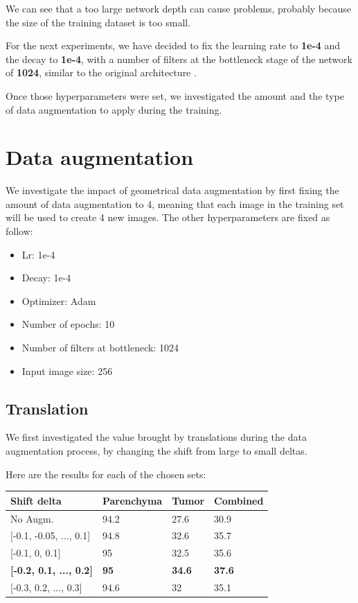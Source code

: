 We can see that a too large network depth can cause problems, probably
because the size of the training dataset is too small.

For the next experiments, we have decided to fix the learning rate to
\textbf{1e-4} and the decay to \textbf{1e-4}, with a number of filters
at the bottleneck stage of the network of \textbf{1024}, similar to the
original architecture \cite{Ronneberger2015}.

Once those hyperparameters were set, we investigated the amount and the
type of data augmentation to apply during the training.

\section{Data augmentation}\label{data-augmentation}

We investigate the impact of geometrical data augmentation by first
fixing the amount of data augmentation to 4, meaning that each image in
the training set will be used to create 4 new images. The other
hyperparameters are fixed as follow:

\begin{itemize}
\item
  Lr: 1e-4
\item
  Decay: 1e-4
\item
  Optimizer: Adam
\item
  Number of epochs: 10
\item
  Number of filters at bottleneck: 1024
\item
  Input image size: 256
\end{itemize}

\subsection*{Translation }\label{translation}

We first investigated the value brought by translations during the data
augmentation process, by changing the shift from large to small deltas.

Here are the results for each of the chosen sets:

\begin{longtable}[c]{@{}llll@{}}
\toprule
\textbf{Shift delta} & \textbf{Parenchyma} & \textbf{Tumor} &
\textbf{Combined}\tabularnewline
\midrule
\endhead
No Augm. & 94.2 & 27.6 & 30.9\tabularnewline
{[}-0.1, -0.05, ..., 0.1{]} & 94.8 & 32.6 & 35.7\tabularnewline
{[}-0.1, 0, 0.1{]} & 95 & 32.5 & 35.6\tabularnewline
\textbf{{[}-0.2, 0.1, ..., 0.2{]}} & \textbf{95} & \textbf{34.6} &
\textbf{37.6}\tabularnewline
{[}-0.3, 0.2, ..., 0.3{]} & 94.6 & 32 & 35.1\tabularnewline
\bottomrule
\end{longtable}

